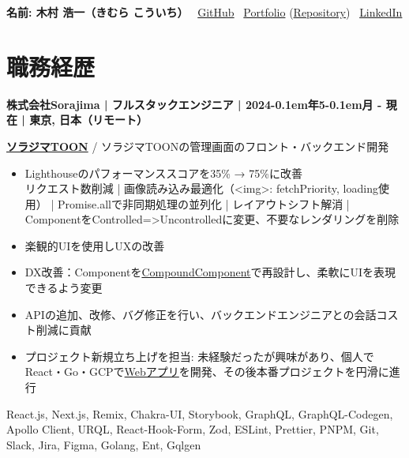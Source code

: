 \documentclass{article}
\begin{document}
\noindent
\textbf{\large 名前: 木村 浩一（きむら こういち）} \textbar\
\href{https://github.com/kupuma-ru21}{GitHub} \textbar\
\href{https://kupuma-ru21.com/}{Portfolio} (\href{https://github.com/kupuma-ru21/portfolio}{Repository}) \textbar\
\href{https://www.linkedin.com/in/koichi-kimura-06ba14259/}{LinkedIn}

\vspace{-1em}

\section*{職務経歴}

\noindent
\textbf{株式会社Sorajima | フルスタックエンジニア | 2024\kern-0.1em年5\kern-0.1em月 - 現在 | 東京, 日本（リモート）}

\vspace{0.3em}

\textbf{\href{https://sorajimatoon.com/}{ソラジマTOON}} / ソラジマTOONの管理画面のフロント・バックエンド開発

\begin{itemize}[leftmargin=1.5em]

  \item Lighthouseのパフォーマンススコアを35\% → 75\%に改善\\[0.5\baselineskip]
  \noindent
  リクエスト数削減 | 画像読み込み最適化（<img>: fetchPriority, loading使用） | Promise.allで非同期処理の並列化 | レイアウトシフト解消 | ComponentをControlled=>Uncontrolledに変更、不要なレンダリングを削除

  \item 楽観的UIを使用しUXの改善

  \item DX改善：Componentを\href{https://kentcdodds.com/blog/compound-components-with-react-hooks}{CompoundComponent}で再設計し、柔軟にUIを表現できるよう変更

  \item APIの追加、改修、バグ修正を行い、バックエンドエンジニアとの会話コスト削減に貢献

  \item プロジェクト新規立ち上げを担当: 未経験だったが興味があり、個人でReact・Go・GCPで\href{https://github.com/kupuma-ru21/portfolio}{Webアプリ}を開発、その後本番プロジェクトを円滑に進行

\end{itemize}

\noindent
{}%
\parbox[t]{\dimexpr\linewidth-3em\relax}{
React.js, Next.js, Remix, Chakra-UI, Storybook, GraphQL, GraphQL-Codegen, Apollo Client, URQL, React-Hook-Form, Zod, ESLint, Prettier, PNPM, Git, Slack, Jira, Figma, Golang, Ent, Gqlgen
}
\end{document}
